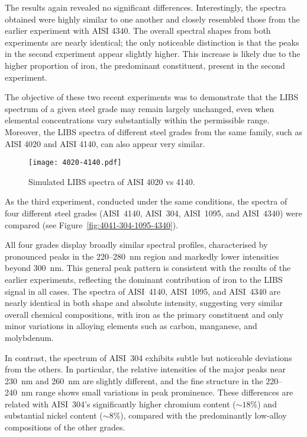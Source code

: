 \documentclass[12pt,a4paper]{article}
\begin{document}
	The results again revealed no significant differences. Interestingly, the spectra obtained were highly similar to one another and closely resembled those from the earlier experiment with AISI 4340. The overall spectral shapes from both experiments are nearly identical; the only noticeable distinction is that the peaks in the second experiment appear slightly higher. This increase is likely due to the higher proportion of iron, the predominant constituent, present in the second experiment.
	
	The objective of these two recent experiments was to demonstrate that the LIBS spectrum of a given steel grade may remain largely unchanged, even when elemental concentrations vary substantially within the permissible range. Moreover, the LIBS spectra of different steel grades from the same family, such as AISI 4020 and AISI 4140, can also appear very similar.
	
	
	\begin{figure}[h!]
		\centering
		\texttt{[image: 4020-4140.pdf]}
		\caption{Simulated LIBS spectra of AISI 4020 vs 4140.}
		\label{fig:4020-4140}
	\end{figure} 

 	
 	As the third experiment, conducted under the same conditions, the spectra of four different steel grades (AISI~4140, AISI~304, AISI~1095, and AISI~4340) were compared (see Figure~\ref{fig:4041-304-1095-4340}).  
 	
 	All four grades display broadly similar spectral profiles, characterised by pronounced peaks in the 220--280~nm region and markedly lower intensities beyond 300~nm. This general peak pattern is consistent with the results of the earlier experiments, reflecting the dominant contribution of iron to the LIBS signal in all cases. The spectra of AISI~4140, AISI~1095, and AISI~4340 are nearly identical in both shape and absolute intensity, suggesting very similar overall chemical compositions, with iron as the primary constituent and only minor variations in alloying elements such as carbon, manganese, and molybdenum.  
 	
 	In contrast, the spectrum of AISI~304 exhibits subtle but noticeable deviations from the others. In particular, the relative intensities of the major peaks near 230~nm and 260~nm are slightly different, and the fine structure in the 220--240~nm range shows small variations in peak prominence. These differences are related with AISI~304’s significantly higher chromium content (\(\sim18\%\)) and substantial nickel content (\(\sim8\%\)), compared with the predominantly low-alloy compositions of the other grades. 
 	
\end{document}

